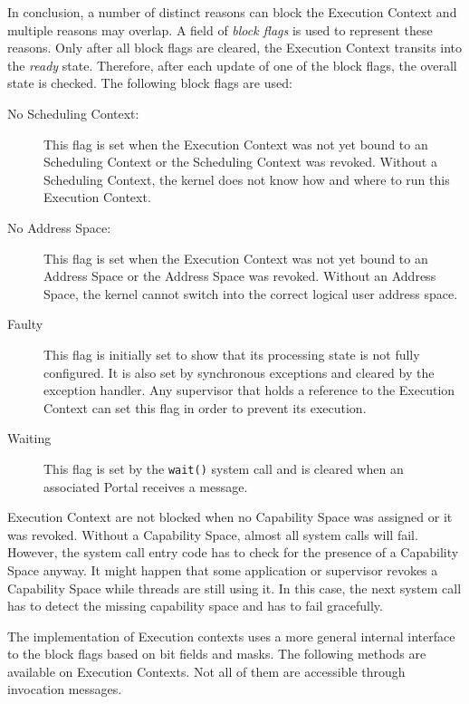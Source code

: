 In conclusion, a number of distinct reasons can block the Execution Context and multiple reasons may overlap. A field of \emph{block flags} is used to represent these reasons. Only after all block flags are cleared, the Execution Context transits into the \emph{ready} state. Therefore, after each update of one of the block flags, the overall state is checked. The following block flags are used:

\begin{description}
\item[No Scheduling Context:] This flag is set when the Execution Context was not yet bound to an Scheduling Context or the Scheduling Context was revoked. Without a Scheduling Context, the kernel does not know how and where to run this Execution Context.
\item[No Address Space:] This flag is set when the Execution Context was not yet bound to an Address Space or the Address Space was revoked. Without an Address Space, the kernel cannot switch into the correct logical user address space.
\item[Faulty] This flag is initially set to show that its processing state is not fully configured. It is also set by synchronous exceptions and cleared by the exception handler. Any supervisor that holds a reference to the Execution Context can set this flag in order to prevent its execution.
\item[Waiting] This flag is set by the \texttt{wait()} system call and is cleared when an associated Portal receives a message.
\end{description}

Execution Context are not blocked when no Capability Space was assigned or it was revoked. Without a Capability Space, almost all system calls will fail. However, the system call entry code has to check for the presence of a Capability Space anyway. It might happen that some application or supervisor revokes a Capability Space while threads are still using it. In this case, the next system call has to detect the missing capability space and has to fail gracefully.   

The implementation of Execution contexts uses a more general internal interface to the block flags based on bit fields and masks. The following methods are available on Execution Contexts. Not all of them are accessible through invocation messages. 

